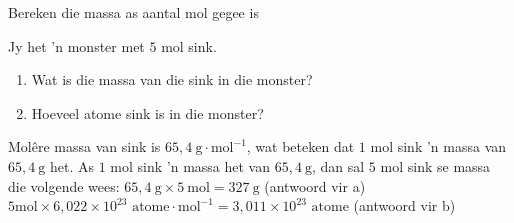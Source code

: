       \begin{wex}{Bereken die massa as aantal mol gegee is }{
      \label{m38717*id276928}Jy het 'n monster met $5$ mol sink.
      \label{m38717*id276934}\begin{enumerate}[noitemsep, label=\textbf{\alph*}. ] 
            \label{m38717*uid12}\item Wat is die massa van die sink in die monster?
\label{m38717*uid13}\item Hoeveel atome sink is in die monster?
\end{enumerate}
}
{
      \label{m38717*id276984} Mol\^{e}re massa van sink is $65,4 ~\text{g} \cdot \text{mol}^{-1}$, wat beteken dat $1$ mol sink 'n massa van $65,4 ~\text{g}$ het.
      \label{m38717*id277021}As $1$ mol sink 'n massa het van $65,4 ~\text{g}$, dan sal $5$ mol sink se massa die volgende wees: $65,4 ~\text{g} \times 5 ~\text{mol}=327 ~\text{g}$ (antwoord vir a) 
$5 \text{mol} \times 6,022 \times {10}^{23} \text{ atome} \cdot \text{mol}^{-1} = 3,011 \times {10}^{23} \text{ atome}$
      \label{m38717*id277263}(antwoord vir b)
}
    \end{wex}
    \noindent 
\label{m38717*secfhsst!!!underscore!!!id305}

